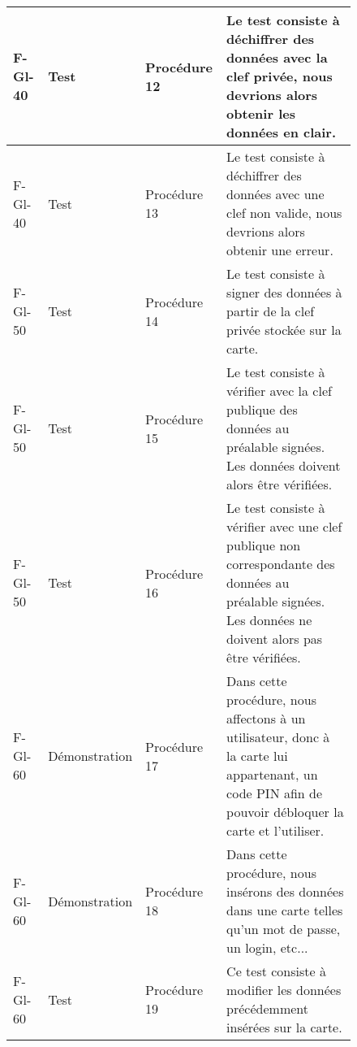 \documentclass[a4paper,11pt,french]{article}
\begin{document}
\begin{figure}[!h]
\begin{tabular}{|p{2cm}|p{2.5cm}|p{2cm}|p{9cm}|}
\hline
F-Gl-40 & Test & Procédure 12 & Le test consiste à déchiffrer des données
avec la clef privée, nous devrions alors obtenir les données en clair. \\
\hline
F-Gl-40 & Test & Procédure 13 & Le test consiste à déchiffrer des données
avec une clef non valide, nous devrions alors obtenir une erreur. \\
\hline
F-Gl-50 & Test & Procédure 14 & Le test consiste à signer des données à
partir de la clef privée stockée sur la carte. \\
\hline
F-Gl-50 & Test & Procédure 15 & Le test consiste à vérifier avec la clef
publique des données au préalable signées. Les données doivent alors être
vérifiées. \\
\hline
F-Gl-50 & Test & Procédure 16 & Le test consiste à vérifier avec une clef
publique non correspondante des données au préalable signées. Les données
ne doivent alors pas être vérifiées. \\
\hline
F-Gl-60 & Démonstration & Procédure 17 & Dans cette procédure, nous
affectons à un utilisateur, donc à la carte lui appartenant, un code PIN
afin de pouvoir débloquer la carte et l'utiliser. \\
\hline
F-Gl-60 & Démonstration & Procédure 18 & Dans cette procédure, nous
insérons des données dans une carte telles qu'un mot de passe, un login, 
etc... \\
\hline
F-Gl-60 & Test & Procédure 19 & Ce test consiste à modifier les données
précédemment insérées sur la carte. \\
\hline
\end{tabular}
\end{figure}

\clearpage
\end{document}
